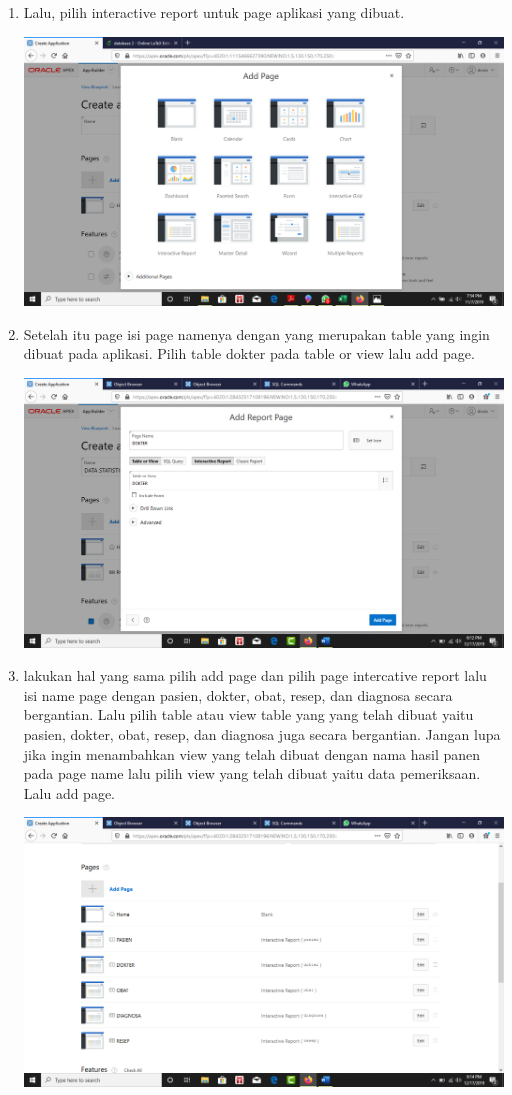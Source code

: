 \begin{enumerate}
\begin{center}
    \end{center}
    \item Lalu, pilih interactive report untuk page aplikasi yang dibuat.
     \begin{center}
    \includegraphics[width=10cm\textwidth]{gambar/22.png}
    \end{center}
    \item Setelah itu page isi page namenya dengan  yang merupakan table yang ingin dibuat pada aplikasi. Pilih table dokter pada table or view lalu add page.
    \begin{center}
    \includegraphics[width=10cm\textwidth]{gambar/23.png}
    \end{center}
    \item lakukan hal yang sama pilih add page dan pilih page intercative report lalu isi name page dengan pasien, dokter, obat, resep, dan diagnosa secara bergantian. Lalu pilih table atau view table yang yang telah dibuat yaitu pasien, dokter, obat, resep, dan diagnosa juga secara bergantian. Jangan lupa jika ingin menambahkan view yang telah dibuat dengan nama hasil panen pada page name lalu pilih view yang telah dibuat yaitu data pemeriksaan. Lalu add page.
    \begin{center}
    \includegraphics[width=10cm\textwidth]{gambar/24.png}

\end{center}
\end{enumerate}
